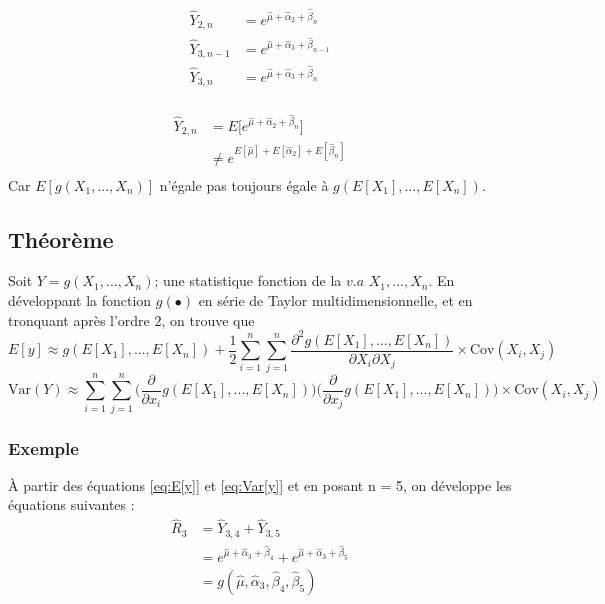 \begin{itemize}
\begin{align*}
\widehat{Y}_{2,n} &= e^{\widehat{\mu} + \widehat{\alpha}_2 + \widehat{\beta}_n} \\
\widehat{Y}_{3,n-1} &= e^{\widehat{\mu} + \widehat{\alpha}_3 + \widehat{\beta}_{n-1}} \\
\widehat{Y}_{3,n} &= e^{\widehat{\mu} + \widehat{\alpha}_3 + \widehat{\beta}_n} \\
\end{align*}

\end{itemize}

\begin{align*}
\widehat{Y}_{2,n} &= E \Bigg[ e^{\widehat{\mu} + \widehat{\alpha}_2 + \widehat{\beta}_n} \Bigg] \\
&\neq e^{E[\widehat{\mu}] + E[\widehat{\alpha}_2] + E[\widehat{\beta}_n]} \\
\end{align*}
Car $ E[g(X_1,...,X_n)]$ n'égale pas toujours égale à $g(E[X_1],...,E[X_n])$.

\subsection*{Théorème}
Soit $Y = g(X_1,...,X_n)$; une statistique fonction de la $v.a$ $X_1,...,X_n$. En développant la fonction $g(\bullet)$ en série de Taylor multidimensionnelle, et en tronquant après l'ordre 2, on trouve que
\begin{equation}
\label{eq:E[y]}
E[y] \approx g(E[X_1],...,E[X_n]) + \frac{1}{2} \sum_{i=1}^{n} \sum_{j=1}^{n} \frac{\partial^2 g(E[X_1],...,E[X_n])}{\partial X_i \partial X_j} \times \text{Cov}(X_i, X_j) 
\end{equation}
\begin{equation}
\label{eq:Var[y]}
\text{Var}(Y) \approx \sum_{i=1}^{n} \sum_{j=1}^{n} \Bigg( \frac{\partial}{\partial x_i} g(E[X_1],...,E[X_n]) \Bigg) \Bigg( \frac{\partial}{\partial x_j} g(E[X_1],...,E[X_n]) \Bigg) \times \text{Cov}(X_i, X_j)
\end{equation}

\subsubsection*{Exemple}
À partir des équations \ref{eq:E[y]} et \ref{eq:Var[y]} et en posant n = 5, on développe les équations suivantes :
\begin{align*}
\widehat{R}_3 &= \widehat{Y}_{3,4} + \widehat{Y}_{3,5} \\
&= e^{\widehat{\mu} + \widehat{\alpha}_3 + \widehat{\beta}_4} +  e^{\widehat{\mu} + \widehat{\alpha}_3 + \widehat{\beta}_5} \\
&= g(\widehat{\mu}, \widehat{\alpha}_3, \widehat{\beta}_4, \widehat{\beta}_5)
\end{align*}


